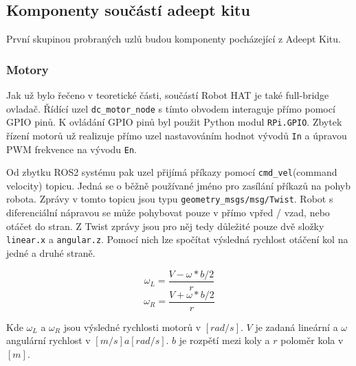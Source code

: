 \subsection*{Komponenty součástí adeept kitu}
První skupinou probraných uzlů budou komponenty pocházející z Adeept Kitu.

\subsubsection*{Motory}
Jak už bylo řečeno v teoretické části, součástí Robot HAT je také full-bridge ovladač. Řídící uzel \verb|dc_motor_node| s tímto obvodem interaguje přímo pomocí GPIO pinů. K ovládání GPIO pinů byl použit Python modul \verb|RPi.GPIO|. Zbytek řízení motorů už realizuje přímo uzel nastavováním hodnot vývodů \verb|In| a úpravou PWM frekvence na vývodu \verb|En|.

Od zbytku ROS2 systému pak uzel přijímá příkazy pomocí \verb|cmd_vel|(command velocity) topicu. Jedná se o běžně používané jméno pro zasílání příkazů na pohyb robota. Zprávy v tomto topicu jsou typu \verb|geometry_msgs/msg/Twist|. Robot s diferenciální nápravou se může pohybovat pouze v přímo vpřed / vzad, nebo otáčet do stran. Z Twist zprávy jsou pro něj tedy důležité pouze dvě složky \verb|linear.x| a \verb|angular.z|. Pomocí nich lze spočítat výsledná rychlost otáčení kol na jedné a druhé straně.

$$\omega_L = \frac{V - \omega * b/2}{r}$$
$$\omega_R = \frac{V + \omega * b/2}{r}$$

\noindent Kde $\omega_L$ a $\omega_R$ jsou výsledné rychlosti motorů v $[rad/s]$. $V$ je zadaná lineární a $\omega$ angulární rychlost v $[m/s] a [rad/s]$. $b$ je rozpětí mezi koly a $r$ poloměr kola v $[m]$. \cite{diff_drive}

